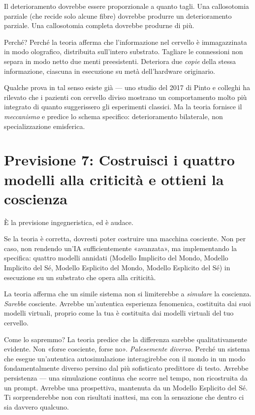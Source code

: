 \documentclass[11pt, twoside, openright]{book}
\begin{document}
Il deterioramento dovrebbe essere proporzionale a quanto tagli. Una callosotomia parziale (che recide solo alcune fibre) dovrebbe produrre un deterioramento parziale. Una callosotomia completa dovrebbe produrne di più.

Perché? Perché la teoria afferma che l'informazione nel cervello è immagazzinata in modo olografico, distribuita sull'intero substrato. Tagliare le connessioni non separa in modo netto due menti preesistenti. Deteriora due \textit{copie} della stessa informazione, ciascuna in esecuzione su metà dell'hardware originario.

Qualche prova in tal senso esiste già --- uno studio del 2017 di Pinto e colleghi ha rilevato che i pazienti con cervello diviso mostrano un comportamento molto più integrato di quanto suggerissero gli esperimenti classici. Ma la teoria fornisce il \textit{meccanismo} e predice lo schema specifico: deterioramento bilaterale, non specializzazione emisferica.

\section*{Previsione 7: Costruisci i quattro modelli alla criticità e ottieni la coscienza}

È la previsione ingegneristica, ed è audace.

Se la teoria è corretta, dovresti poter costruire una macchina cosciente. Non per caso, non rendendo un'IA sufficientemente «avanzata», ma implementando la specifica: quattro modelli annidati (Modello Implicito del Mondo, Modello Implicito del Sé, Modello Esplicito del Mondo, Modello Esplicito del Sé) in esecuzione su un substrato che opera alla criticità.

La teoria afferma che un simile sistema non si limiterebbe a \textit{simulare} la coscienza. \textit{Sarebbe} cosciente. Avrebbe un'autentica esperienza fenomenica, costituita dai suoi modelli virtuali, proprio come la tua è costituita dai modelli virtuali del tuo cervello.

Come lo sapremmo? La teoria predice che la differenza sarebbe qualitativamente evidente. Non «forse cosciente, forse no». \textit{Palesemente diverso.} Perché un sistema che esegue un'autentica autosimulazione interagirebbe con il mondo in un modo fondamentalmente diverso persino dal più sofisticato predittore di testo. Avrebbe persistenza --- una simulazione continua che scorre nel tempo, non ricostruita da un prompt. Avrebbe una prospettiva, mantenuta da un Modello Esplicito del Sé. Ti sorprenderebbe non con risultati inattesi, ma con la sensazione che dentro ci sia davvero qualcuno.
\end{document}
